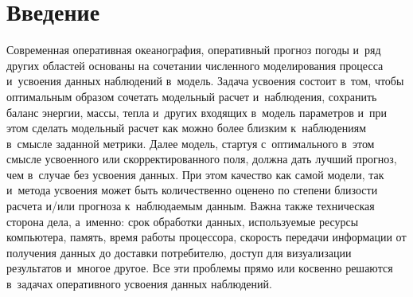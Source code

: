 \thispagestyle{headings}

\begin{multicols}{2}

\label{st\stat}


\section{Введение}

Современная оперативная океанография, оперативный прогноз погоды и~ряд других
областей основаны на сочетании численного моделирования процесса и~усвоения данных
наблюдений в~модель. Задача усвоения состоит в~том, чтобы оптимальным образом
сочетать модельный расчет и~наблюдения, сохранить баланс энергии,
массы, тепла и~других входящих в~модель параметров и~при этом сделать модельный расчет как можно более близким к~наблюдениям в~смысле заданной метрики. Далее модель, стартуя с~оптимального в~этом смысле усвоенного или скорректированного поля, должна дать лучший прогноз, чем в~случае без усвоения данных. При этом качество как самой модели, так и~метода усвоения может быть количественно оценено по степени близости расчета и/или прогноза к~наблюдаемым данным.
Важна также техническая сторона дела, а~именно: срок обработки данных, используемые ресурсы компьютера, память, время работы процессора, скорость передачи информации от получения данных до доставки потребителю, доступ для визуализации результатов и~многое другое. Все эти проблемы прямо
или косвенно решаются в~задачах оперативного усвоения данных наблюдений.


\end{multicols}
